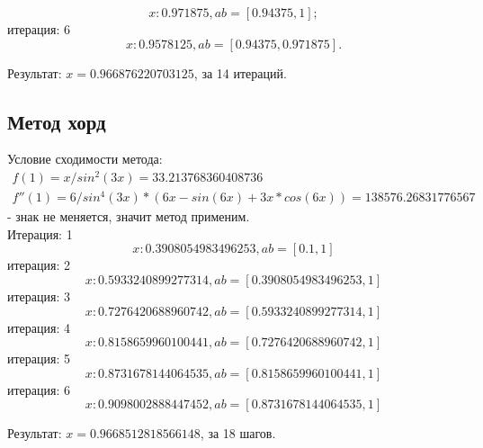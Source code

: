 \documentclass{article}
\begin{document}
\begin{displaymath}
  x: 0.971875, ab = [0.94375, 1];
\end{displaymath}
итерация: 6
\begin{displaymath}
  x: 0.9578125, ab = [0.94375, 0.971875].
\end{displaymath}

Результат: $x = 0.966876220703125$, за 14 итераций.

\subsection{Метод хорд}
Условие сходимости метода: 
\begin{displaymath}
  \begin{array}{ccc}
    f(1) = x / sin^2(3x) = 33.213768360408736 \\
    f''(1) = 6/sin^4(3x) * (6x - sin(6x) + 3x * cos(6x)) = 138576.26831776567
  \end{array}
\end{displaymath}
- знак не меняется, значит метод применим.\\
Итерация: 1
\begin{displaymath} 
  x: 0.3908054983496253, ab = [0.1, 1]
\end{displaymath}
итерация: 2
\begin{displaymath}
  x: 0.5933240899277314, ab = [0.3908054983496253, 1]
\end{displaymath}
итерация: 3
\begin{displaymath}
  x: 0.7276420688960742, ab = [0.5933240899277314, 1]
\end{displaymath}
итерация: 4
\begin{displaymath}
  x: 0.8158659960100441, ab = [0.7276420688960742, 1]
\end{displaymath}
итерация: 5
\begin{displaymath}
  x: 0.8731678144064535, ab = [0.8158659960100441, 1]
\end{displaymath}
итерация: 6
\begin{displaymath}
  x: 0.9098002888447452, ab = [0.8731678144064535, 1]
\end{displaymath}

Результат: $x = 0.9668512818566148$, за 18 шагов.
\end{document}

